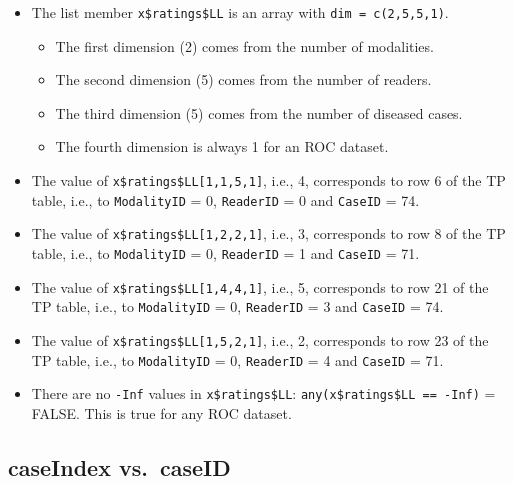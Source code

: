 \documentclass[
]{book}
\providecommand{\tightlist}{%
  \setlength{\itemsep}{0pt}\setlength{\parskip}{0pt}}
\begin{document}
\begin{itemize}
\tightlist
\item
  The list member \texttt{x\$ratings\$LL} is an array with \texttt{dim\ =\ c(2,5,5,1)}.

  \begin{itemize}
  \tightlist
  \item
    The first dimension (2) comes from the number of modalities.
  \item
    The second dimension (5) comes from the number of readers.
  \item
    The third dimension (5) comes from the number of diseased cases.
  \item
    The fourth dimension is always 1 for an ROC dataset.
  \end{itemize}
\item
  The value of \texttt{x\$ratings\$LL{[}1,1,5,1{]}}, i.e., 4, corresponds to row 6 of the TP table, i.e., to \texttt{ModalityID} = 0, \texttt{ReaderID} = 0 and \texttt{CaseID} = 74.
\item
  The value of \texttt{x\$ratings\$LL{[}1,2,2,1{]}}, i.e., 3, corresponds to row 8 of the TP table, i.e., to \texttt{ModalityID} = 0, \texttt{ReaderID} = 1 and \texttt{CaseID} = 71.
\item
  The value of \texttt{x\$ratings\$LL{[}1,4,4,1{]}}, i.e., 5, corresponds to row 21 of the TP table, i.e., to \texttt{ModalityID} = 0, \texttt{ReaderID} = 3 and \texttt{CaseID} = 74.
\item
  The value of \texttt{x\$ratings\$LL{[}1,5,2,1{]}}, i.e., 2, corresponds to row 23 of the TP table, i.e., to \texttt{ModalityID} = 0, \texttt{ReaderID} = 4 and \texttt{CaseID} = 71.
\item
  There are no \texttt{-Inf} values in \texttt{x\$ratings\$LL}: \texttt{any(x\$ratings\$LL\ ==\ -Inf)} = FALSE. This is true for any ROC dataset.
\end{itemize}

\hypertarget{dataset-object-details-read-datafile-correspondence-case-index-vs-case-id}{%
\subsection{caseIndex vs.~caseID}\label{dataset-object-details-read-datafile-correspondence-case-index-vs-case-id}}
\end{document}
